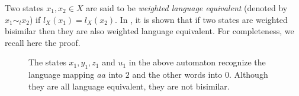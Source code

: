 \documentclass[3p]{elsarticle}
\begin{document}
Two states $x_1, x_2\in X$ are said to be \emph{weighted language
equivalent} (denoted by $x_1\sim_l x_2$) if $l_X(x_1)=l_X(x_2)$. In
\cite{german}, it is shown that if two states are weighted bisimilar
then they are also weighted language equivalent. For completeness,
we recall here the proof.
\begin{figure}[t]{%
\MediumPicture
%
\begin{center}
\end{center}
\vspace*{.2cm} \caption{The states $x_1,y_1,z_1$ and $u_1$ in the above automaton
recognize the language mapping $aa$ into $2$ and the other words
into $0$.
 Although they are all language equivalent, they are not bisimilar.}\label{fig:examplebislan}}
\end{figure}
\end{document}

